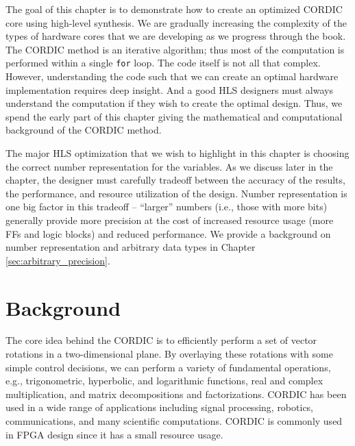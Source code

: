 
The goal of this chapter is to demonstrate how to create an optimized CORDIC core using high-level synthesis. We are gradually increasing the complexity of the types of hardware cores that we are developing as we progress through the book. The CORDIC method is an iterative algorithm; thus most of the computation is performed within a single \lstinline|for| loop. The code itself is not all that complex. However, understanding the code such that we can create an optimal hardware implementation requires deep insight. And a good HLS designers must always understand the computation if they wish to create the optimal design. Thus, we spend the early part of this chapter giving the mathematical and computational background of the CORDIC method.  

The major HLS optimization that we wish to highlight in this chapter is choosing the correct number representation for the variables. As we discuss later in the chapter, the designer must carefully tradeoff between the accuracy of the results, the performance, and resource utilization of the design. Number representation is one big factor in this tradeoff -- ``larger'' numbers (i.e., those with more bits) generally provide more precision at the cost of increased resource usage (more FFs and logic blocks) and reduced performance. We provide a background on number representation and arbitrary data types in Chapter \ref{sec:arbitrary_precision}. 


\section{Background}
\label{subsec:CORDIC_Basics}

The core idea behind the CORDIC is to efficiently perform a set of vector rotations in a two-dimensional plane. By overlaying these rotations with some simple control decisions, we can perform a variety of fundamental operations, e.g., trigonometric, hyperbolic, and logarithmic functions, real and complex multiplication, and matrix decompositions and factorizations.  CORDIC has been used in a wide range of applications including signal processing, robotics, communications, and many scientific computations. CORDIC is commonly used in FPGA design since it has a small resource usage. 

